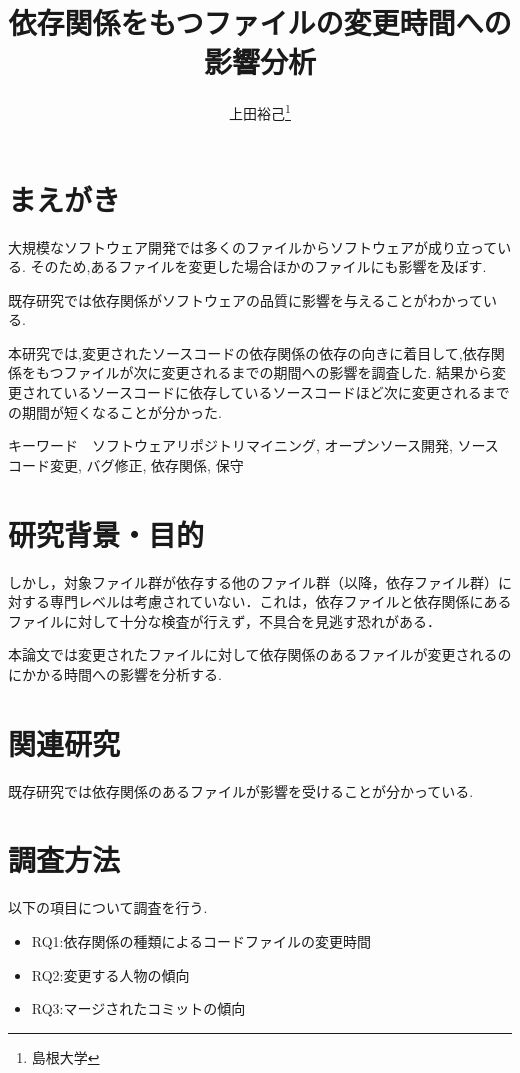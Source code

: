 \documentclass{jsarticle}
\begin{document}
\title{依存関係をもつファイルの変更時間への影響分析}
\author{上田裕己\thanks{島根大学}}
\date{}
\maketitle

\section{まえがき}
大規模なソフトウェア開発では多くのファイルからソフトウェアが成り立っている.
そのため,あるファイルを変更した場合ほかのファイルにも影響を及ぼす.

既存研究では依存関係がソフトウェアの品質に影響を与えることがわかっている.

本研究では,変更されたソースコードの依存関係の依存の向きに着目して,依存関係をもつファイルが次に変更されるまでの期間への影響を調査した.
  結果から変更されているソースコードに依存しているソースコードほど次に変更されるまでの期間が短くなることが分かった.
  
キーワード　ソフトウェアリポジトリマイニング, オープンソース開発, ソースコード変更, バグ修正, 依存関係, 保守

\section{研究背景・目的} 



しかし，対象ファイル群が依存する他のファイル群（以降，依存ファイル群）に対する専門レベルは考慮されていない．これは，依存ファイルと依存関係にあるファイルに対して十分な検査が行えず，不具合を見逃す恐れがある．



本論文では変更されたファイルに対して依存関係のあるファイルが変更されるのにかかる時間への影響を分析する.

\section{関連研究}
既存研究では依存関係のあるファイルが影響を受けることが分かっている.


\section{調査方法}
以下の項目について調査を行う.
\begin{itemize}
\item RQ1:依存関係の種類によるコードファイルの変更時間
\item RQ2:変更する人物の傾向
\item RQ3:マージされたコミットの傾向
\end{itemize}
\end{document}
